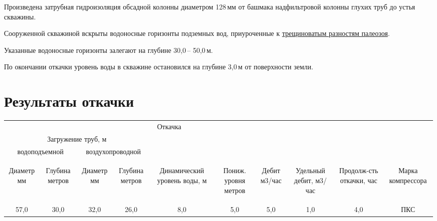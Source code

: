 \documentclass[a4paper,12pt]{article} %
\newcommand{\txtDepth}{50,0}						%
\newcommand{\txtDebit}{5,0}							%
\newcommand{\txtDebitRel}{1,0}						%
\newcommand{\txtLevel}{3,0}							%
\newcommand{\txtLevelDyanm}{8,0}					%
\newcommand{\txtHorizDepth}{30,0}					%
\newcommand{\txtGeology}{трещиноватым разностям палеозоя}
\newcommand{\txtTubeDiam}{128}							%
\begin{document}
\bigskip

Произведена затрубная гидроизоляция обсадной колонны диаметром \txtTubeDiam \,мм от башмака надфильтровой колонны глухих труб до устья скважины.

Сооруженной скважиной вскрыты водоносные горизонты  подземных вод, приуроченные к \underline{\txtGeology}.

Указанные водоносные горизонты залегают на глубине   \txtHorizDepth \,– \txtDepth \,м.

По окончании откачки уровень воды в скважине остановился на глубине  \txtLevel \,м от поверхности земли.

\section*{Результаты откачки}

\begin{center}
\begin{tabular}{|c|c|c|c|c|c|c|c|c|c|}
	\hline 
	\multicolumn{8}{|c|}{Откачка}&  &  \\ 
	\cline{1-8} 
	\multicolumn{4}{|c|}{Загружение труб, м}  &  &  &  &  &  &  \\ 
	\cline{1-4} 
	\multicolumn{2}{|c|}{водоподъемной} & \multicolumn{2}{c|}{воздухопроводной} &  &  &  &  &  & \\ 
	\cline{1-4} 
	\begin{sideways}Диаметр мм\end{sideways} &
	\begin{sideways}Глубина метров\end{sideways} &
	\begin{sideways}Диаметр мм\end{sideways} &
	\begin{sideways}Глубина метров\end{sideways} &
	\begin{sideways}Динамический уровень воды, м\end{sideways} &
	\begin{sideways}Пониж. уровня метров\end{sideways} &
	\begin{sideways}Дебит м3/час\end{sideways} &
	\begin{sideways}Удельный дебит, м3/час\end{sideways} &
	\begin{sideways}Продолж-сть откачки, час\end{sideways} &
	\begin{sideways}Марка компрессора\end{sideways} \\ 
	\hline 
	57,0 & 30,0 & 32,0 & 26,0 & \txtLevelDyanm & 5,0 & \txtDebit & \txtDebitRel & 4,0 & ПКС \\ 
	\hline 
\end{tabular} 
\end{center}
\end{document}
